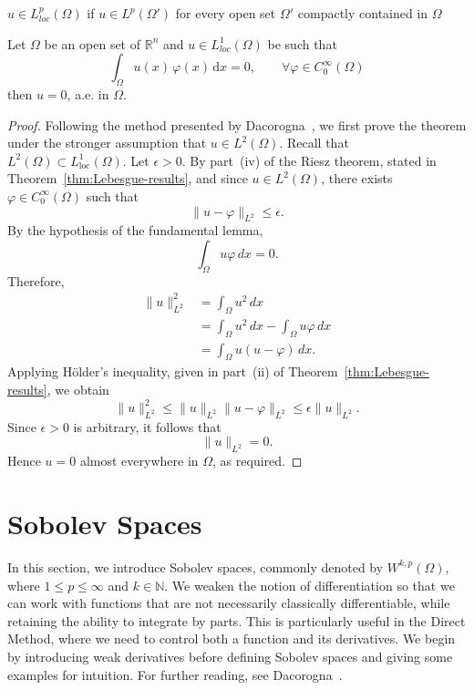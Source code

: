 \begin{definition}
    $u \in L^p_{loc}(\Omega)$ if $u \in L^p(\Omega')$ for every open set $\Omega'$ compactly contained in $\Omega$
\end{definition}
\begin{theorem}
\label{thm:Fundamental lemma of the calculus of variations}
Let $\Omega$ be an open set of $\mathbb{R}^n$ and $u \in L^1_{loc}(\Omega)$ be such that 
$$
\int_\Omega u(x)\, \varphi(x) \, \mathrm{d}x = 0, \qquad \forall \varphi \in C^{\infty}_0(\Omega)
$$
then $u = 0$, a.e. in $\Omega$.
\end{theorem}
\begin{proof}
Following the method presented by Dacorogna~\cite[p.~27]{dacorogna}, we first prove the theorem under the stronger assumption that \(u\in L^2(\Omega)\). Recall that \(L^2(\Omega)\subset L^1_{\mathrm{loc}}(\Omega)\). Let \(\epsilon>0\). By part~(iv) of the Riesz theorem, stated in Theorem~\ref{thm:Lebesgue-results}, and since \(u\in L^2(\Omega)\), there exists \(\varphi\in C_0^\infty(\Omega)\) such that
\[
    \|u-\varphi\|_{L^2}\leq\epsilon.
\]
By the hypothesis of the fundamental lemma,
\[
    \int_\Omega u\varphi\,dx=0.
\]
Therefore,
\[
\begin{aligned}
    \|u\|_{L^2}^2
    &=\int_\Omega u^2\,dx\\
    &=\int_\Omega u^2\,dx-\int_\Omega u\varphi\,dx\\
    &=\int_\Omega u(u-\varphi)\,dx.
\end{aligned}
\]
Applying Hölder's inequality, given in part~(ii) of Theorem~\ref{thm:Lebesgue-results}, we obtain
\[
    \|u\|_{L^2}^2
    \leq
    \|u\|_{L^2}\|u-\varphi\|_{L^2}
    \leq
    \epsilon\|u\|_{L^2}.
\]
Since \(\epsilon>0\) is arbitrary, it follows that
\[
    \|u\|_{L^2}=0.
\]
Hence \(u=0\) almost everywhere in \(\Omega\), as required.
\end{proof}

\section{Sobolev Spaces}
\label{sec:Sobolev_Spaces}
In this section, we introduce Sobolev spaces, commonly denoted by \(W^{k,p}(\Omega)\), where \(1\leq p\leq\infty\) and \(k\in\mathbb{N}\). We weaken the notion of differentiation so that we can work with functions that are not necessarily classically differentiable, while retaining the ability to integrate by parts. This is particularly useful in the Direct Method, where we need to control both a function and its derivatives. We begin by introducing weak derivatives before defining Sobolev spaces and giving some examples for intuition. For further reading, see Dacorogna~\cite[p.~30]{dacorogna}.

